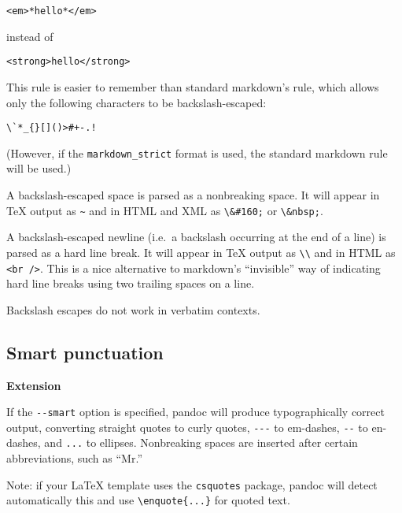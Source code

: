 \documentclass[]{article}
\begin{document}
\begin{verbatim}
<em>*hello*</em>
\end{verbatim}

instead of

\begin{verbatim}
<strong>hello</strong>
\end{verbatim}

This rule is easier to remember than standard markdown's rule, which
allows only the following characters to be backslash-escaped:

\begin{verbatim}
\`*_{}[]()>#+-.!
\end{verbatim}

(However, if the \texttt{markdown\_strict} format is used, the standard
markdown rule will be used.)

A backslash-escaped space is parsed as a nonbreaking space. It will
appear in TeX output as \texttt{\textasciitilde{}} and in HTML and XML
as \texttt{\textbackslash{}\&\#160;} or
\texttt{\textbackslash{}\&nbsp;}.

A backslash-escaped newline (i.e.~a backslash occurring at the end of a
line) is parsed as a hard line break. It will appear in TeX output as
\texttt{\textbackslash{}\textbackslash{}} and in HTML as
\texttt{\textless{}br /\textgreater{}}. This is a nice alternative to
markdown's ``invisible'' way of indicating hard line breaks using two
trailing spaces on a line.

Backslash escapes do not work in verbatim contexts.

\subsection{Smart punctuation}

\textbf{Extension}

If the \texttt{-{}-smart} option is specified, pandoc will produce
typographically correct output, converting straight quotes to curly
quotes, \texttt{-{}-{}-} to em-dashes, \texttt{-{}-} to en-dashes, and
\texttt{...} to ellipses. Nonbreaking spaces are inserted after certain
abbreviations, such as ``Mr.''

Note: if your LaTeX template uses the \texttt{csquotes} package, pandoc
will detect automatically this and use
\texttt{\textbackslash{}enquote\{...\}} for quoted text.

\end{document}

